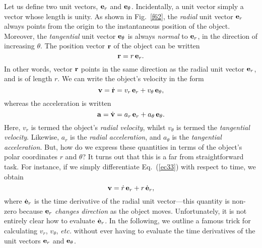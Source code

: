 Let us define two unit vectors, ${\bf e}_r$ and ${\bf e}_\theta$. Incidentally,
a unit vector simply a vector whose length is unity. 
As shown in Fig.~\ref{f62}, the {\em radial}
unit vector ${\bf e}_r$ always points from the origin to the instantaneous position of the object.
Moreover, the {\em tangential} unit vector ${\bf e}_\theta$ is always {\em normal}
to  ${\bf e}_r$, in the direction of increasing $\theta$. The position vector ${\bf r}$
of the object can be written
\begin{equation}
{\bf r} = r\,{\bf e}_r.\label{ec33}
\end{equation}
In other words, vector ${\bf r}$ points in the same direction as the radial unit vector 
${\bf e}_r$, and is of
length $r$. We can write the object's velocity in the form
\begin{equation}\label{ec56}
{\bf v} = \dot{\bf r} = v_r\,{\bf e}_r + v_\theta\,{\bf e}_\theta,
\end{equation}
whereas the acceleration is written
 \begin{equation}\label{ec57}
{\bf a} = \dot{\bf v} = a_r\,{\bf e}_r + a_\theta\,{\bf e}_\theta.
\end{equation}
Here, $v_r$ is termed the object's {\em radial velocity}, whilst $v_\theta$ is
termed the {\em tangential velocity}. Likewise, $a_r$ is the {\em radial acceleration},
and $a_\theta$ is the {\em tangential acceleration}. But, how do we express these
quantities in terms of the object's polar coordinates $r$ and $\theta$? It turns out that this
is a far from straightforward task. For instance, if we simply differentiate Eq.~(\ref{ec33})
with respect to time, we obtain
\begin{equation}
{\bf v}=\dot{r}\,{\bf e}_r + r\,\dot{\bf e}_r,
\end{equation}
where $\dot{\bf e}_r$ is the time derivative of the radial unit vector---this quantity
is non-zero because ${\bf e}_r$ {\em changes direction} as the object moves. Unfortunately,
it is not entirely clear how to evaluate $\dot{\bf e}_r$. In the following, we
outline a famous trick for calculating $v_r$, $v_\theta$, {\em etc.} without
ever having to evaluate the time derivatives of the unit vectors
${\bf e}_r$ and ${\bf e}_\theta$. 


